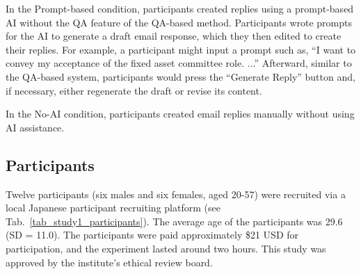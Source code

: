 In the Prompt-based condition, participants created replies using a prompt-based AI without the QA feature of the QA-based method.
Participants wrote prompts for the AI to generate a draft email response, which they then edited to create their replies.
For example, a participant might input a prompt such as, ``I want to convey my acceptance of the fixed asset committee role. ...''
Afterward, similar to the QA-based system, participants would press the ``Generate Reply'' button and, if necessary, either regenerate the draft or revise its content.

In the No-AI condition, participants created email replies manually without using AI assistance.

\subsection{Participants}

Twelve participants (six males and six females, aged 20-57) were recruited via a local Japanese participant recruiting platform (see Tab.~\ref{tab_study1_participants}).
The average age of the participants was 29.6 (SD = 11.0). 
The participants were paid approximately \$21 USD for participation, and the experiment lasted around two hours.
This study was approved by the institute's ethical review board.

